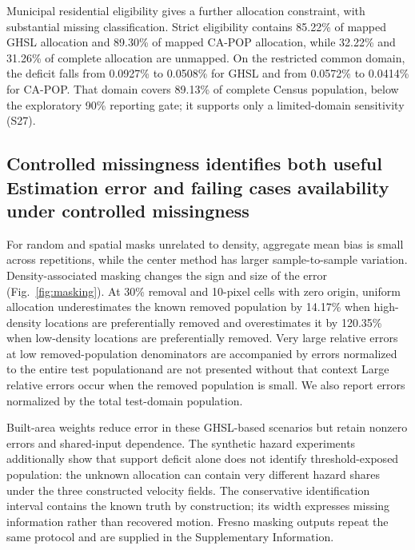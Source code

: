 \documentclass[pdflatex,sn-nature]{sn-jnl}
\providecommand{\DIFadd}[1]{{\protect\color{blue} \sf #1}} %
\providecommand{\DIFdel}[1]{{\protect\color{red} \scriptsize #1}} %
\providecommand{\DIFaddbegin}{} %
\providecommand{\DIFaddend}{} %
\providecommand{\DIFdelbegin}{} %
\providecommand{\DIFdelend}{} %
\begin{document}
Municipal residential eligibility gives a further allocation constraint, with substantial missing classification. Strict eligibility contains 85.22\% of mapped GHSL allocation and 89.30\% of mapped CA-POP allocation, while 32.22\% and 31.26\% of complete allocation are unmapped. On the restricted common domain, the deficit falls from 0.0927\% to 0.0508\% for GHSL and from 0.0572\% to 0.0414\% for CA-POP. That domain covers 89.13\% of complete Census population, below the exploratory 90\% reporting gate; it supports only a limited-domain sensitivity (S27).

\subsection{\DIFdelbegin \DIFdel{Controlled missingness identifies both useful }\DIFdelend \DIFaddbegin \DIFadd{Estimation error }\DIFaddend and \DIFdelbegin \DIFdel{failing cases}\DIFdelend \DIFaddbegin \DIFadd{availability under controlled missingness}\DIFaddend }
For random and spatial masks unrelated to density, aggregate mean bias is small across repetitions, while the center method has larger sample-to-sample variation. Density-associated masking changes the sign and size of the error (Fig.~\ref{fig:masking}). At 30\% removal and 10-pixel cells with zero origin, uniform allocation underestimates the known removed population by 14.17\% when high-density locations are preferentially removed and overestimates it by 120.35\% when low-density locations are preferentially removed. \DIFdelbegin \DIFdel{Very large relative errors at low removed-population denominators are accompanied by errors normalized to the entire test populationand are not presented without that context}\DIFdelend \DIFaddbegin \DIFadd{Large relative errors occur when the removed population is small. We also report errors normalized by the total test-domain population}\DIFaddend .

Built-area weights reduce error in these GHSL-based scenarios but retain nonzero errors and shared-input dependence. The synthetic hazard experiments additionally show that support deficit alone does not identify threshold-exposed population: the unknown allocation can contain very different hazard shares under the three constructed velocity fields. The conservative identification interval contains the known truth by construction; its width expresses missing information rather than recovered motion. Fresno masking outputs repeat the same protocol and are supplied in the Supplementary Information.
\end{document}
